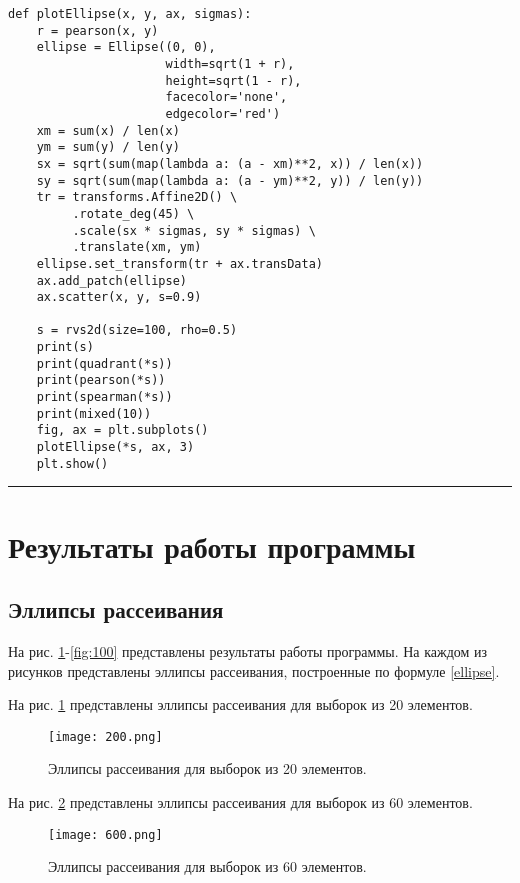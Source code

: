 \documentclass[12pt]{article}
\begin{document}
\begin{verbatim}
def plotEllipse(x, y, ax, sigmas):
    r = pearson(x, y)
    ellipse = Ellipse((0, 0),
                      width=sqrt(1 + r),
                      height=sqrt(1 - r),
                      facecolor='none',
                      edgecolor='red')
    xm = sum(x) / len(x)
    ym = sum(y) / len(y)
    sx = sqrt(sum(map(lambda a: (a - xm)**2, x)) / len(x))
    sy = sqrt(sum(map(lambda a: (a - ym)**2, y)) / len(y))
    tr = transforms.Affine2D() \
         .rotate_deg(45) \
         .scale(sx * sigmas, sy * sigmas) \
         .translate(xm, ym)
    ellipse.set_transform(tr + ax.transData)
    ax.add_patch(ellipse)
    ax.scatter(x, y, s=0.9)    
        
    s = rvs2d(size=100, rho=0.5)
    print(s)
    print(quadrant(*s))
    print(pearson(*s))
    print(spearman(*s))
    print(mixed(10))
    fig, ax = plt.subplots()
    plotEllipse(*s, ax, 3)
    plt.show()

\end{verbatim}
\hrule width 16cm height 1pt

\newpage

\section{Результаты работы программы}

\subsection{Эллипсы рассеивания}

На рис. \ref{fig:20}-\ref{fig:100} представлены результаты  работы программы. На каждом из рисунков представлены эллипсы рассеивания, построенные по формуле \eqref{ellipse}.

На рис. \ref{fig:20} представлены эллипсы рассеивания для выборок из 20 элементов.

\begin{figure}[H]
	\centering
	\texttt{[image: 200.png]}
	\caption{Эллипсы рассеивания для выборок из 20 элементов.}
	\label{fig:20}
\end{figure}

На рис. \ref{fig:60} представлены эллипсы рассеивания для выборок из 60 элементов.

\begin{figure}[H]
	\centering
	\texttt{[image: 600.png]}
	\caption{Эллипсы рассеивания для выборок из 60 элементов.}
	\label{fig:60}
\end{figure}
\end{document}
